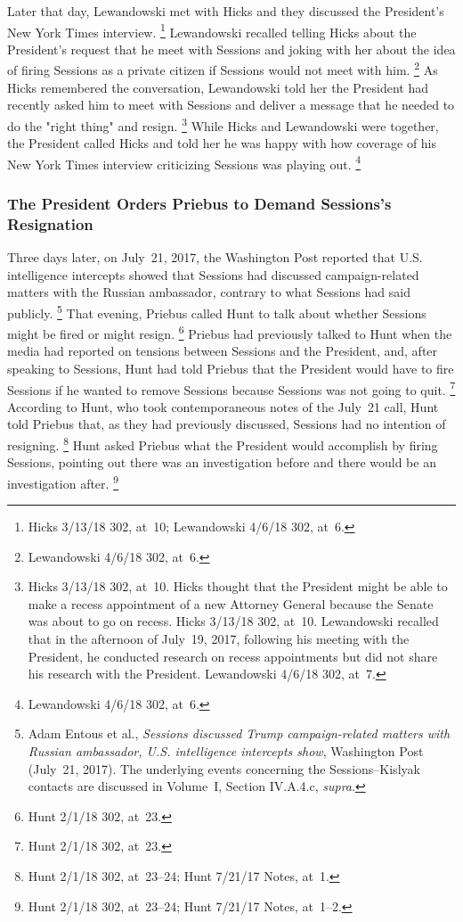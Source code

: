Later that day, Lewandowski met with Hicks and they discussed the President's New York Times interview.%
\footnote{Hicks 3/13/18 302, at~10;
Lewandowski 4/6/18 302, at~6.}
Lewandowski recalled telling Hicks about the President's request that he meet with Sessions and joking with her about the idea of firing Sessions as a private citizen if Sessions would not meet with him.%
\footnote{Lewandowski 4/6/18 302, at~6.}
As Hicks remembered the conversation, Lewandowski told her the President had recently asked him to meet with Sessions and deliver a message that he needed to do the "right thing" and resign.%
\footnote{Hicks 3/13/18 302, at~10.
Hicks thought that the President might be able to make a recess appointment of a new Attorney General because the Senate was about to go on recess.
Hicks 3/13/18 302, at~10.
Lewandowski recalled that in the afternoon of July~19, 2017, following his meeting with the President, he conducted research on recess appointments but did not share his research with the President.
Lewandowski 4/6/18 302, at~7.}
While Hicks and Lewandowski were together, the President called Hicks and told her he was happy with how coverage of his New York Times interview criticizing Sessions was playing out.%
\footnote{Lewandowski 4/6/18 302, at~6.}

\subsubsection{The President Orders Priebus to Demand Sessions's Resignation}

Three days later, on July~21, 2017, the Washington Post reported that U.S. intelligence intercepts showed that Sessions had discussed campaign-related matters with the Russian ambassador, contrary to what Sessions had said publicly.%
\footnote{Adam Entous et al., \textit{Sessions discussed Trump campaign-related matters with Russian ambassador, U.S. intelligence intercepts show}, Washington Post (July~21, 2017).
The underlying events concerning the Sessions--Kislyak contacts are discussed in Volume~I, Section IV.A.4.c, \textit{supra}.}
That evening, Priebus called Hunt to talk about whether Sessions might be fired or might resign.%
\footnote{Hunt 2/1/18 302, at~23.}
Priebus had previously talked to Hunt when the media had reported on tensions between Sessions and the President, and, after speaking to Sessions, Hunt had told Priebus that the President would have to fire Sessions if he wanted to remove Sessions because Sessions was not going to quit.%
\footnote{Hunt 2/1/18 302, at~23.}
According to Hunt, who took contemporaneous notes of the July~21 call, Hunt told Priebus that, as they had previously discussed, Sessions had no intention of resigning.%
\footnote{Hunt 2/1/18 302, at~23--24;
Hunt 7/21/17 Notes, at~1.}
Hunt asked Priebus what the President would accomplish by firing Sessions, pointing out there was an investigation before and there would be an investigation after.%
\footnote{Hunt 2/1/18 302, at~23--24;
Hunt 7/21/17 Notes, at~1--2.}

